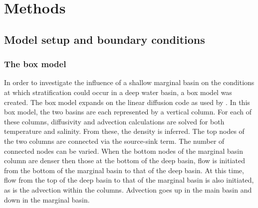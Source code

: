 \documentclass[twocolumn]{article}
\begin{document}




\section{Methods}
\subsection{Model setup and boundary conditions}
\subsubsection{The box model}
In order to investigate the influence of a shallow marginal basin on the conditions at which stratification could occur in a deep water basin, a box model was created. The box model expands on the linear diffusion code as used by \cite{Heiden2017Application}. In this box model, the two basins are each represented by a vertical column. For each of these columns, diffusivity and advection calculations are solved for both temperature and salinity. From these, the density is inferred. The top nodes of the two columns are connected via the source-sink term. The number of connected nodes can be varied. When the bottom nodes of the marginal basin column are denser then those at the bottom of the deep basin, flow is initiated from the bottom of the marginal basin to that of the deep basin. At this time, flow from the top of the deep basin to that of the marginal basin is also initiated, as is the advection within the columns. Advection goes up in the main basin and down in the marginal basin.
\end{document}
